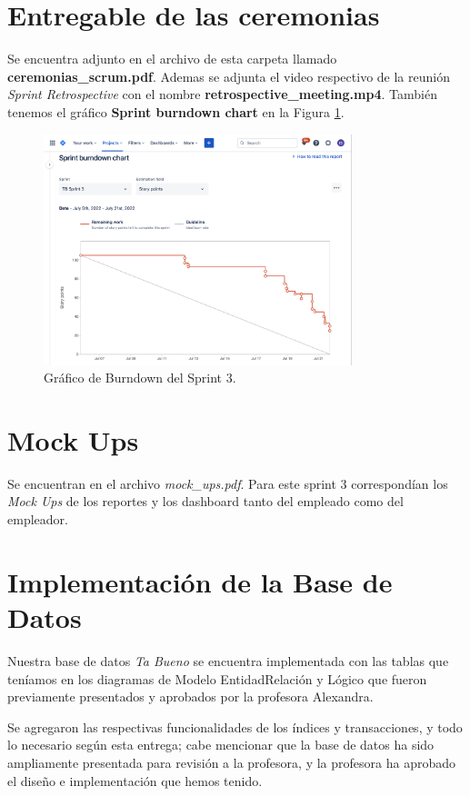 \documentclass{article}
\begin{document}
\section{Entregable de las ceremonias}
Se encuentra adjunto en el archivo de esta carpeta llamado \textbf{ceremonias\_scrum.pdf}. Ademas se
adjunta el video respectivo de la reunión \textit{Sprint Retrospective} con el nombre
\textbf{retrospective\_meeting.mp4}.
También tenemos el gráfico \textbf{Sprint burndown chart} en la Figura \ref{fig:burndown}.
\begin{figure}[h]
  \centering
  \includegraphics[width=0.80\textwidth]{burndown.png}
  \caption{Gráfico de Burndown del Sprint 3.}
  \label{fig:burndown}
 \end{figure}

\section{Mock Ups}
Se encuentran en el archivo \textit{mock\_ups.pdf}. Para este sprint 3 correspondían 
los \textit{Mock Ups} de los reportes y los dashboard tanto del empleado como del empleador.

 \section{Implementación de la Base de Datos}
Nuestra base de datos \textit{Ta Bueno} se encuentra implementada con las tablas que teníamos
en los diagramas de Modelo Entidad\-Relación y Lógico que fueron previamente presentados y aprobados por la profesora 
Alexandra.

Se agregaron las respectivas funcionalidades de los índices y transacciones, y todo lo necesario
según esta entrega; cabe mencionar que la base de datos ha sido ampliamente presentada para revisión
a la profesora, y la profesora ha aprobado el diseño e implementación que hemos tenido.
\end{document}
